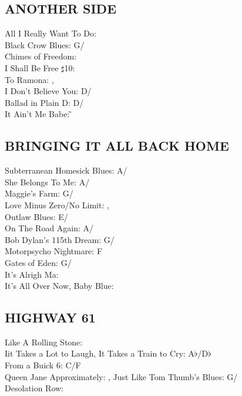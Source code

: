  \subsection{ANOTHER SIDE}
All I Really Want To Do: \A\\ Black Crow Blues: G/\C\\ Chimes of Freedom: \G\\ I Shall Be Free $\sharp$10: \G\\ To Ramona: \C,\\
 I Don't Believe You: D/\G\\ Ballad in Plain D: D/\G\\ It Ain't Me Babe: \G


\subsection{BRINGING IT ALL BACK HOME}
Subterranean Homesick Blues: A/\D\\ She Belongs To Me: A/\D\\ Maggie's Farm: G/\C\\ Love Minus Zero/No Limit: \E,\\
 Outlaw Blues: E/\A\\ On The Road Again: A/\D\\ Bob Dylan's 115th Dream: G/\C\\ Motorpsycho Nightmare: F\\ Gates of Eden: G/\C\\ It's Alrigh Ma: \E\\ It's All Over Now, Baby Blue: \E


\subsection{HIGHWAY 61}
Like A Rolling Stone: \C\\ Iit Takes a Lot to Laugh, It Takes a Train to Cry: A$\flat$/D$\flat$\\
From a Buick 6: C/F\\ Queen Jane Approximately: \C,
Just Like Tom Thumb's Blues: G/\C\\ Desolation Row: \E


